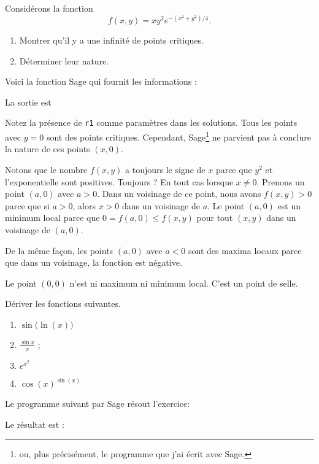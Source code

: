 \begin{example}     \label{exEEHPooKDxLTJ}


	Considérons la fonction
	\begin{equation}
		f(x,y)=xy^2 e^{-(x^2+y^2)/4}.
	\end{equation}
	\begin{enumerate}

		\item
			Montrer qu'il y a une infinité de points critiques.
		\item
			Déterminer leur nature.

	\end{enumerate}

	Voici la fonction Sage qui fournit les informations :

	

	La sortie est


	Notez la présence de \verb+r1+ comme paramètres dans les solutions. Tous les points avec $y=0$ sont des points critiques. Cependant, Sage\footnote{ou, plus précisément, le programme que j'ai écrit avec Sage.} ne parvient pas à conclure la nature de ces points $(x,0)$.

	Notons que le nombre $f(x,y)$ a toujours le signe de $x$ parce que $y^2$ et l'exponentielle sont positives. Toujours ? En tout cas lorsque $x\neq 0$. Prenons un point $(a,0)$ avec $a>0$. Dans un voisinage de ce point, nous avons $f(x,y)>0$ parce que si $a>0$, alors $x>0$ dans un voisinage de $a$. Le point $(a,0)$ est un minimum local parce que $0=f(a,0)\leq f(x,y)$ pour tout $(x,y)$ dans un voisinage de $(a,0)$.

	De la même façon, les points $(a,0)$ avec $a<0$ sont des maxima locaux parce que dans un voisinage, la fonction est négative.

	Le point $(0,0)$ n'est ni maximum ni minimum local. C'est un point de selle.

\end{example}

\begin{example}     \label{exRNZKooUIOfPU}

    Dériver les fonctions suivantes.
	\begin{enumerate}
		\item
			$\sin\big( \ln(x) \big)$
		\item
			$\displaystyle \frac{\sin x}{x}$ ;
		\item
			$ e^{x^2}$
		\item
			$\cos(x)^{\sin(x)}$
	\end{enumerate}

Le programme suivant par Sage résout l'exercice:


Le résultat est :

\end{example}

